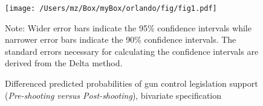 \begin{figure}
    \label{fig1}
    \begin{center}
    \caption{Differenced predicted probabilities of gun control legislation support (\emph{Pre-shooting versus Post-shooting}), bivariate specification}
    \texttt{[image: /Users/mz/Box/myBox/orlando/fig/fig1.pdf]}\\
    \end{center}
    \scriptsize Note: Wider error bars indicate the 95\% confidence intervals while narrower error bars indicate the 90\% confidence intervals. The standard errors necessary for calculating the confidence intervals are derived from the Delta method.
\end{figure}
